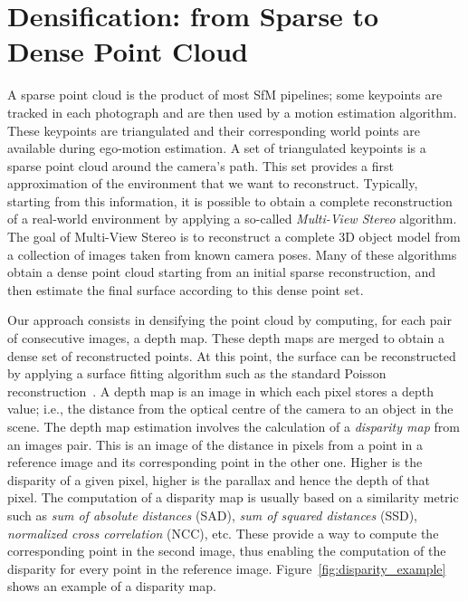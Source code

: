 \section{Densification: from Sparse to Dense Point Cloud}
\label{sec:mvs}
A sparse point cloud is the product of most SfM pipelines; some keypoints are tracked in each photograph and are then used by a motion estimation algorithm. These keypoints are triangulated and their corresponding world points are available during ego-motion estimation.
%
A set of triangulated keypoints is a sparse point cloud around the camera's path. This set provides a first approximation of the environment that we want to reconstruct.
Typically, starting from this information, it is possible to obtain a complete reconstruction of a real-world environment by applying
a so-called \emph{Multi-View Stereo} algorithm. The goal of Multi-View Stereo\cite{seitz2006comparison} is to reconstruct a complete
3D object model from a collection of images taken from known camera poses.
Many of these algorithms obtain a dense point cloud starting from an initial sparse reconstruction, and then estimate the final surface according to this dense point set.

Our approach consists in densifying the point cloud by computing, for each pair of consecutive images, 
a depth map. These depth maps are merged to obtain a dense set of reconstructed points. At this point, the 
surface can be reconstructed by applying a surface fitting algorithm such as
the standard Poisson reconstruction~\cite{Kazhdan:2006:PSR:1281957.1281965}.
A depth map is an image in which each pixel stores a depth value; i.e., the distance from the optical centre of the camera to an object in the scene.
The depth map estimation involves the calculation of a \emph{disparity map} from an images pair. 
This is an image of the distance in pixels from a point in a reference image and its corresponding
point in the other one. Higher is the disparity of a given pixel, higher is the parallax and hence the depth of that pixel. 
%
The computation of a disparity map is usually based on a similarity metric such as 
\emph{sum of absolute distances} (SAD), \emph{sum of squared distances} (SSD), 
\emph{normalized cross correlation} (NCC), etc. 
These provide a way to compute the corresponding point in the second image, thus enabling the 
computation of the disparity for every point in the reference image.
Figure~\ref{fig:disparity_example} shows an example of a disparity map.

